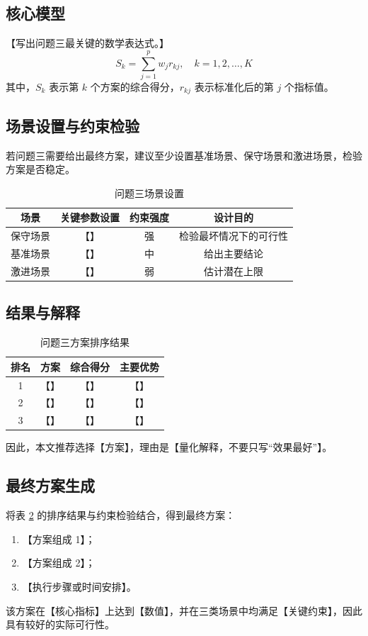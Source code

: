 \documentclass{cumcmthesis}
\begin{document}
\subsection{核心模型}
【写出问题三最关键的数学表达式。】
\begin{equation}
  S_k = \sum_{j=1}^{p} w_j r_{kj},\quad k=1,2,\ldots,K
  \label{eq:q3-score}
\end{equation}
其中，$S_k$ 表示第 $k$ 个方案的综合得分，$r_{kj}$ 表示标准化后的第 $j$ 个指标值。

\subsection{场景设置与约束检验}
若问题三需要给出最终方案，建议至少设置基准场景、保守场景和激进场景，检验方案是否稳定。

\begin{table}[H]
  \centering
  \caption{问题三场景设置}
  \label{tab:q3-scenarios}
  \begin{tabular}{cccc}
    \toprule
    场景 & 关键参数设置 & 约束强度 & 设计目的 \\
    \midrule
    保守场景 & 【】 & 强 & 检验最坏情况下的可行性 \\
    基准场景 & 【】 & 中 & 给出主要结论 \\
    激进场景 & 【】 & 弱 & 估计潜在上限 \\
    \bottomrule
  \end{tabular}
\end{table}

\subsection{结果与解释}
\begin{table}[H]
  \centering
  \caption{问题三方案排序结果}
  \label{tab:q3-ranking}
  \begin{tabular}{cccc}
    \toprule
    排名 & 方案 & 综合得分 & 主要优势 \\
    \midrule
    1 & 【】 & 【】 & 【】 \\
    2 & 【】 & 【】 & 【】 \\
    3 & 【】 & 【】 & 【】 \\
    \bottomrule
  \end{tabular}
\end{table}

因此，本文推荐选择【方案】，理由是【量化解释，不要只写“效果最好”】。

\subsection{最终方案生成}
将表 \ref{tab:q3-ranking} 的排序结果与约束检验结合，得到最终方案：
\begin{enumerate}
  \item 【方案组成 1】；
  \item 【方案组成 2】；
  \item 【执行步骤或时间安排】。
\end{enumerate}
该方案在【核心指标】上达到【数值】，并在三类场景中均满足【关键约束】，因此具有较好的实际可行性。
\end{document}
